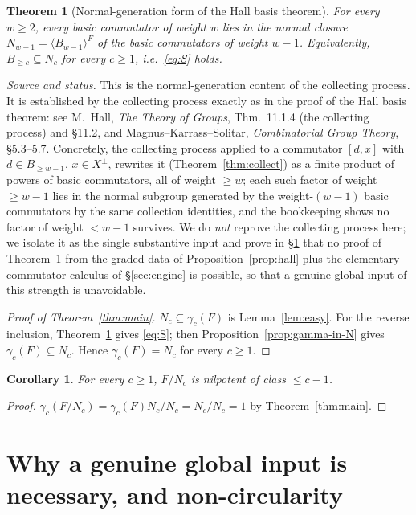 \documentclass{amsart}
\newtheorem{theorem}{Theorem}
\newtheorem{corollary}{Corollary}
\theoremstyle{definition}
\theoremstyle{remark}
\begin{document}
\begin{theorem}[Normal-generation form of the Hall basis theorem]\label{thm:S}
For every $w\ge2$, every basic commutator of weight $w$ lies in the normal closure
$N_{w-1}=\langle B_{w-1}\rangle^{F}$ of the basic commutators of weight $w-1$.
Equivalently, $B_{\ge c}\subseteq N_c$ for every $c\ge1$, i.e.\ \eqref{eq:S} holds.
\end{theorem}

\noindent\emph{Source and status.} This is the normal-generation content of the
collecting process. It is established by the collecting process exactly as in the
proof of the Hall basis theorem: see M.~Hall, \emph{The Theory of Groups},
Thm.~11.1.4 (the collecting process) and \S11.2, and
Magnus--Karrass--Solitar, \emph{Combinatorial Group Theory}, \S5.3--5.7. Concretely,
the collecting process applied to a commutator $[d,x]$ with $d\in B_{\ge w-1}$,
$x\in X^{\pm}$, rewrites it (Theorem~\ref{thm:collect}) as a finite product of
powers of basic commutators, all of weight $\ge w$; each such factor of weight
$\ge w-1$ lies in the normal subgroup generated by the weight-$(w-1)$ basic
commutators by the same collection identities, and the bookkeeping shows no factor
of weight $<w-1$ survives. We do \emph{not} reprove the collecting process here; we
isolate it as the single substantive input and prove in \S\ref{sec:why} that no
proof of Theorem~\ref{thm:S} from the graded data of Proposition~\ref{prop:hall}
plus the elementary commutator calculus of \S\ref{sec:engine} is possible, so that
a genuine global input of this strength is unavoidable.

\begin{proof}[Proof of Theorem~\ref{thm:main}]
$N_c\subseteq\gamma_c(F)$ is Lemma~\ref{lem:easy}. For the reverse inclusion,
Theorem~\ref{thm:S} gives \eqref{eq:S}; then Proposition~\ref{prop:gamma-in-N}
gives $\gamma_c(F)\subseteq N_c$. Hence $\gamma_c(F)=N_c$ for every $c\ge1$.
\end{proof}

\begin{corollary}
For every $c\ge1$, $F/N_c$ is nilpotent of class $\le c-1$.
\end{corollary}
\begin{proof}
$\gamma_c(F/N_c)=\gamma_c(F)N_c/N_c=N_c/N_c=1$ by Theorem~\ref{thm:main}.
\end{proof}

\section{Why a genuine global input is necessary, and non-circularity}
\label{sec:why}
\end{document}
